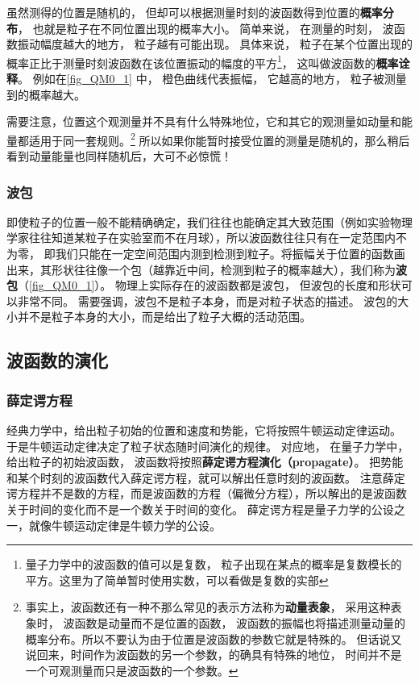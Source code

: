 虽然测得的位置是随机的， 但却可以根据测量时刻的波函数得到位置的\textbf{概率分布}， 也就是粒子在不同位置出现的概率大小。 简单来说， 在测量的时刻， 波函数振动幅度越大的地方， 粒子越有可能出现。 具体来说， 粒子在某个位置出现的概率正比于测量时刻波函数在该位置振动的幅度的平方\footnote{量子力学中的波函数的值可以是复数， 粒子出现在某点的概率是复数模长的平方。这里为了简单暂时使用实数，可以看做是复数的实部}， 这叫做波函数的\textbf{概率诠释}。 例如在\autoref{fig_QM0_1} 中， 橙色曲线代表振幅， 它越高的地方， 粒子被测量到的概率越大。

需要注意，位置这个观测量并不具有什么特殊地位，它和其它的观测量如动量和能量都适用于同一套规则。\footnote{事实上，波函数还有一种不那么常见的表示方法称为\textbf{动量表象}， 采用这种表象时， 波函数是动量而不是位置的函数， 波函数的振幅也将描述测量动量的概率分布。所以不要认为由于位置是波函数的参数它就是特殊的。 但话说又说回来，时间作为波函数的另一个参数，的确具有特殊的地位， 时间并不是一个可观测量而只是波函数的一个参数。} 所以如果你能暂时接受位置的测量是随机的，那么稍后看到动量能量也同样随机后，大可不必惊慌！

\subsubsection{波包}
即使粒子的位置一般不能精确确定，我们往往也能确定其大致范围（例如实验物理学家往往知道某粒子在实验室而不在月球），所以波函数往往只有在一定范围内不为零， 即我们只能在一定空间范围内测到检测到粒子。将振幅关于位置的函数画出来，其形状往往像一个包（越靠近中间，检测到粒子的概率越大），我们称为\textbf{波包}（\autoref{fig_QM0_1}）。 物理上实际存在的波函数都是波包， 但波包的长度和形状可以非常不同。 需要强调，波包不是粒子本身，而是对粒子状态的描述。 波包的大小并不是粒子本身的大小，而是给出了粒子大概的活动范围。

\subsection{波函数的演化}
\subsubsection{薛定谔方程}
经典力学中，给出粒子初始的位置和速度和势能，它将按照牛顿运动定律运动。 于是牛顿运动定律决定了粒子状态随时间演化的规律。 对应地， 在量子力学中， 给出粒子的初始波函数， 波函数将按照\textbf{薛定谔方程}\textbf{演化（propagate）}。 把势能和某个时刻的波函数代入薛定谔方程，就可以解出任意时刻的波函数。 注意薛定谔方程并不是数的方程，而是波函数的方程（偏微分方程），所以解出的是波函数关于时间的变化而不是一个数关于时间的变化。 薛定谔方程是量子力学的公设之一，就像牛顿运动定律是牛顿力学的公设。

